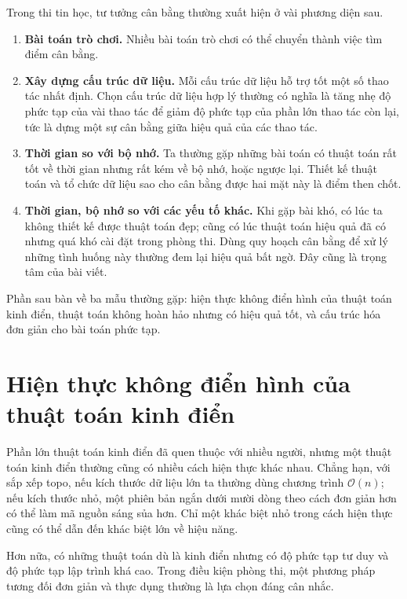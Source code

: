\documentclass[11pt]{article}
\newcommand{\Oh}{\mathcal{O}}
\begin{document}
Trong thi tin học, tư tưởng cân bằng thường xuất hiện ở vài phương diện sau.
\begin{enumerate}
  \item \textbf{Bài toán trò chơi.} Nhiều bài toán trò chơi có thể chuyển
  thành việc tìm điểm cân bằng.
  \item \textbf{Xây dựng cấu trúc dữ liệu.} Mỗi cấu trúc dữ liệu hỗ trợ tốt
  một số thao tác nhất định. Chọn cấu trúc dữ liệu hợp lý thường có nghĩa là
  tăng nhẹ độ phức tạp của vài thao tác để giảm độ phức tạp của phần lớn thao
  tác còn lại, tức là dựng một sự cân bằng giữa hiệu quả của các thao tác.
  \item \textbf{Thời gian so với bộ nhớ.} Ta thường gặp những bài toán có
  thuật toán rất tốt về thời gian nhưng rất kém về bộ nhớ, hoặc ngược lại.
  Thiết kế thuật toán và tổ chức dữ liệu sao cho cân bằng được hai mặt này là
  điểm then chốt.
  \item \textbf{Thời gian, bộ nhớ so với các yếu tố khác.} Khi gặp bài khó,
  có lúc ta không thiết kế được thuật toán đẹp; cũng có lúc thuật toán hiệu
  quả đã có nhưng quá khó cài đặt trong phòng thi. Dùng quy hoạch cân bằng để
  xử lý những tình huống này thường đem lại hiệu quả bất ngờ. Đây cũng là
  trọng tâm của bài viết.
\end{enumerate}

Phần sau bàn về ba mẫu thường gặp: hiện thực không điển hình của thuật toán
kinh điển, thuật toán không hoàn hảo nhưng có hiệu quả tốt, và cấu trúc hóa
đơn giản cho bài toán phức tạp.

\section{Hiện thực không điển hình của thuật toán kinh điển}

Phần lớn thuật toán kinh điển đã quen thuộc với nhiều người, nhưng một thuật
toán kinh điển thường cũng có nhiều cách hiện thực khác nhau. Chẳng hạn, với
sắp xếp topo, nếu kích thước dữ liệu lớn ta thường dùng chương trình
\(\Oh(n)\); nếu kích thước nhỏ, một phiên bản ngắn dưới mười dòng theo cách
đơn giản hơn có thể làm mã nguồn sáng sủa hơn. Chỉ một khác biệt nhỏ trong
cách hiện thực cũng có thể dẫn đến khác biệt lớn về hiệu năng.

Hơn nữa, có những thuật toán dù là kinh điển nhưng có độ phức tạp tư duy và
độ phức tạp lập trình khá cao. Trong điều kiện phòng thi, một phương pháp
tương đối đơn giản và thực dụng thường là lựa chọn đáng cân nhắc.
\end{document}
